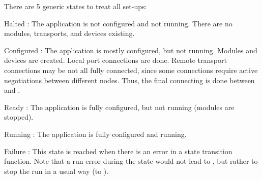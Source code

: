 


There are 5 generic states to treat all set-ups: 
\begin{compactdesc}
\item[Halted] : The application is not configured and not running. 
	 There are no modules, transports, and devices existing.
\item[Configured] : The application is mostly configured, but not running. 
	 Modules and devices are created. Local port connections are done.
	  Remote transport connections may be not all fully connected, 
	  since some connections require active negotiations between different nodes. 
	  Thus, the final connecting is done between 
	   and .  
\item[Ready] : The application is fully configured, but not running 
	 (modules are stopped).
\item[Running] : The application is fully configured and running.
\item[Failure] : This state is reached when there is an error in a 
	 state transition function. Note that a run error during the 
	  state would not lead to , but rather to stop 
	 the run in a usual way (to ).
\end{compactdesc}


